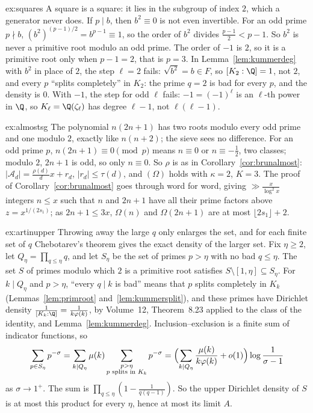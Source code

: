 \begin{solution}{ex:squares}
\idea A square is a square: it lies in the subgroup of index $2$, which a generator never does.
\writeup If $p\mid b$, then $b^2\equiv0$ is not even invertible. For an odd prime $p\nmid b$, $(b^2)^{(p-1)/2}=b^{p-1}\equiv1$, so the order of $b^2$ divides $\frac{p-1}2<p-1$. So $b^2$ is never a primitive root modulo an odd prime. The order of $-1$ is $2$, so it is a primitive root only when $p-1=2$, that is $p=3$.
In Lemma~\ref{lem:kummerdeg} with $b^2$ in place of $2$, the step $\ell=2$ fails: $\sqrt{b^2}=b\in F$, so $[K_2:\Q]=1$, not $2$, and every $p$ ``splits completely'' in $K_2$: the prime $q=2$ is bad for every $p$, and the density is $0$. With $-1$, the step for odd $\ell$ fails: $-1=(-1)^\ell$ is an $\ell$-th power in $\Q$, so $K_\ell=\Q(\zeta_\ell)$ has degree $\ell-1$, not $\ell(\ell-1)$.
\end{solution}

\begin{solution}{ex:almostsg}
\idea The polynomial $n(2n+1)$ has two roots modulo every odd prime and one modulo $2$, exactly like $n(n+2)$; the sieve sees no difference.
\writeup For an odd prime $p$, $n(2n+1)\equiv0\pmod p$ means $n\equiv0$ or $n\equiv-\frac12$, two classes; modulo $2$, $2n+1$ is odd, so only $n\equiv0$. So $\rho$ is as in Corollary~\ref{cor:brunalmost}: $|\mathcal A_d|=\frac{\rho(d)}dx+r_d$, $|r_d|\le\tau(d)$, and $(\Omega)$ holds with $\kappa=2$, $K=3$. The proof of Corollary~\ref{cor:brunalmost} goes through word for word, giving $\gg\frac x{\log^2x}$ integers $n\le x$ such that $n$ and $2n+1$ have all their prime factors above $z=x^{1/(2s_1)}$; as $2n+1\le3x$, $\Omega(n)$ and $\Omega(2n+1)$ are at most $\lfloor2s_1\rfloor+2$.
\end{solution}

\begin{solution}{ex:artinupper}
\idea Throwing away the large $q$ only enlarges the set, and for each finite set of $q$ Chebotarev's theorem gives the exact density of the larger set.
\writeup Fix $\eta\ge2$, let $Q_\eta=\prod_{q\le\eta}q$, and let $S_\eta$ be the set of primes $p>\eta$ with no bad $q\le\eta$. The set $S$ of primes modulo which $2$ is a primitive root satisfies $S\setminus[1,\eta]\subseteq S_\eta$. For $k\mid Q_\eta$ and $p>\eta$, ``every $q\mid k$ is bad'' means that $p$ splits completely in $K_k$ (Lemmas~\ref{lem:primroot} and~\ref{lem:kummersplit}), and these primes have Dirichlet density $\frac1{[K_k:\Q]}=\frac1{k\varphi(k)}$, by Volume~12, Theorem~8.23 applied to the class of the identity, and Lemma~\ref{lem:kummerdeg}. Inclusion--exclusion is a finite sum of indicator functions, so
\[
\sum_{p\in S_\eta}p^{-\sigma}=\sum_{k\mid Q_\eta}\mu(k)\sum_{\substack{p>\eta\\p\text{ splits in }K_k}}p^{-\sigma}=\Bigl(\sum_{k\mid Q_\eta}\frac{\mu(k)}{k\varphi(k)}+o(1)\Bigr)\log\frac1{\sigma-1}
\]
as $\sigma\to1^+$. The sum is $\prod_{q\le\eta}(1-\frac1{q(q-1)})$. So the upper Dirichlet density of $S$ is at most this product for every $\eta$, hence at most its limit $A$.
\end{solution}


